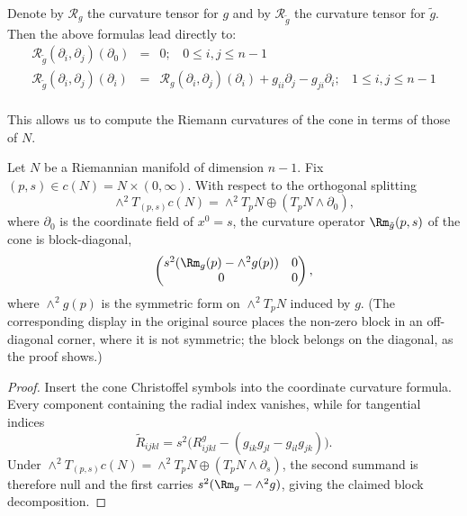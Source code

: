 Denote by ${\mathcal R}_g$ the curvature tensor for $g$ and by
${\mathcal R}_{\tilde g}$ the curvature tensor for $\tilde g$. Then
the above formulas lead directly to:
\begin{eqnarray*}
{\mathcal R}_{\tilde g}(\partial_i,\partial_j)(\partial_0) & = & 0;\ \ \ \  0\le i,j\le n-1 \\
{\mathcal R}_{\tilde g}(\partial_i,\partial_j)(\partial_i) & = &
{\mathcal
R}_g(\partial_i,\partial_j)(\partial_i)+g_{ii}\partial_j-g_{ji}\partial_i;\
\ \ \  1\le i,j\le n-1 \\
\end{eqnarray*}

This allows us to compute the Riemann curvatures of the cone in
terms of those of $N$.

\begin{proposition}
\label{prop:cone-curvature}
\uses{def:cone, def:curvature-operator}
\leanok
\label{conecurv}

Let $N$ be a Riemannian manifold of dimension $n-1$. Fix $(p,s)\in
c(N)=N\times (0,\infty)$. With respect to the orthogonal splitting
$$\wedge^2T_{(p,s)}c(N)=\wedge^2T_pN\oplus
\left(T_pN\wedge\partial_0\right),$$
where $\partial_0$ is the coordinate field of $x^0=s$, the curvature
operator $\Rm_{\tilde g}(p,s)$ of the cone is block-diagonal,
$$\begin{pmatrix} s^2(\Rm_g(p)-\wedge^2g(p)) & 0 \\ 0 & 0
\end{pmatrix},$$
where $\wedge^2g(p)$ is the symmetric form on $\wedge^2T_pN$ induced
by $g$. (The corresponding display in the original source places
the non-zero block in an off-diagonal corner, where it is not
symmetric; the block belongs on the diagonal, as the proof shows.)
\end{proposition}

\begin{proof}
\sketch
{}
Insert the cone Christoffel symbols into the coordinate curvature formula. Every component containing the radial index vanishes, while for tangential indices
\[
  \widetilde R_{ijkl}=s^2\bigl(R^g_{ijkl}-(g_{ik}g_{jl}-g_{il}g_{jk})\bigr).
\]
Under $\wedge^2T_{(p,s)}c(N)=\wedge^2T_pN\oplus(T_pN\wedge\partial_s)$, the second summand is therefore null and the first carries $s^2(\Rm_g-\wedge^2g)$, giving the claimed block decomposition.
\end{proof}

